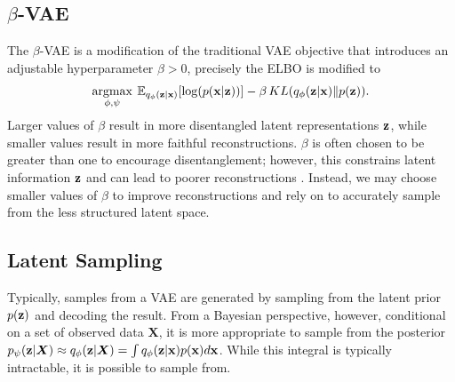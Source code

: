 \documentclass[onefignum,onetabnum]{siamonline190516}
\begin{document}





\subsection{$\beta$-VAE}

The $\beta$-VAE \cite{higgins2016beta} is a modification of the traditional VAE objective that introduces an adjustable hyperparameter $\beta>0$, precisely the ELBO is modified to
\begin{equation}
    \operatorname*{argmax}_{\phi, \psi} \: {\mathbb{E}}_{q_{\phi}({\mathbf{z}}|{\mathbf{x}})}[\log (p({\mathbf{x}}|{\mathbf{z}}))] - \beta \, KL(q_{\phi}({\mathbf{z}}|{\mathbf{x}}) \lVert p({\mathbf{z}})).
\end{equation}
Larger values of $\beta$ result in more disentangled latent representations ${\mathbf{z}}$, while smaller values result in more faithful reconstructions. $\beta$ is often chosen to be greater than one to encourage disentanglement; however, this constrains latent information ${\mathbf{z}}$ and can lead to poorer reconstructions \cite{higgins2016beta}. Instead, we may choose smaller values of $\beta$ to improve reconstructions and rely on  to accurately sample from the less structured latent space.

\subsection{Latent Sampling}
\label{sec:latent_sampling}

Typically, samples from a VAE are generated by sampling from the latent prior $p({\mathbf{z}})$ and decoding the result. From a Bayesian perspective, however, conditional on a set of observed data $\boldsymbol{X}$, it is more appropriate to sample from the posterior $p_{\psi}({\mathbf{z}}|\boldsymbol{X}) \approx q_{\phi}({\mathbf{z}}|\boldsymbol{X}) = \int q_{\phi}({\mathbf{z}}|{\mathbf{x}})p({\mathbf{x}})d{\mathbf{x}}$. While this integral is typically intractable, it is possible to sample from. 
\end{document}
